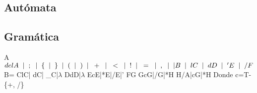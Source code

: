 \documentclass{article}
\begin{document}
\newpage
\subsection*{Autómata}
\newpage
\subsection*{Gramática}
A\rightarrow \textnormal{$ delA \hspace{2mm}|\hspace{2mm} ; \hspace{2mm}|\hspace{2mm} \{ \hspace{2mm}|\hspace{2mm} \} \hspace{2mm}|\hspace{2mm} ( \hspace{2mm}|\hspace{2mm} ) \hspace{2mm}|\hspace{2mm} + \hspace{2mm}|\hspace{2mm} < \hspace{2mm}|\hspace{2mm} ! \hspace{2mm}|\hspace{2mm} = \hspace{2mm}|\hspace{2mm} , \hspace{2mm}|\hspace{2mm} |B\hspace{2mm} |\hspace{2mm} lC \hspace{2mm}| \hspace{2mm} dD \hspace{2mm}|\hspace{2mm} 'E \hspace{2mm}|\hspace{2mm} /F$} 
\smallskip \newline
B\rightarrow=
\smallskip \newline
C\rightarrow lC| dC| \_C|$\lambda$
\smallskip \newline
D\rightarrow dD|$\lambda$
\smallskip \newline
E\rightarrow cE|*E|/E|'
\smallskip \newline
F\rightarrow *G
\smallskip \newline
G\rightarrow cG|/G|*H
\smallskip \newline
H\rightarrow /A|cG|*H
\bigskip \newline 
\textnormal{Donde c=T-\{+, /\}}
\newpage
\end{document}
